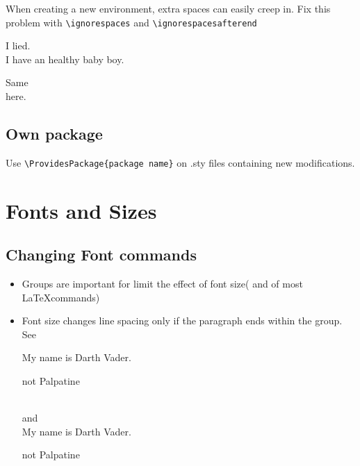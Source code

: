 \documentclass[a4paper,11pt]{article}
\begin{document}
When creating a new environment, extra spaces can easily creep
in. Fix this problem with \verb+\ignorespaces+
and \verb+\ignorespacesafterend+
\begin{correct}
  I lied.\\ I have an healthy baby boy.
\end{correct}
Same\\here.
\subsection{Own package}
Use \verb+\ProvidesPackage{package name}+
on .sty files containing new modifications.

\section{Fonts and Sizes}
\subsection{Changing Font commands}
\begin{itemize}
  \item Groups are important for limit the effect of font size(%
  and of most \LaTeX commands)
  \item Font size changes line spacing only if the paragraph
  ends within the group. See\\
  {\Large My name is Darth Vader. \par not Palpatine}\\
  and\\
  {\Large My name is Darth Vader.}\par not Palpatine
\end{itemize}
\end{document}
